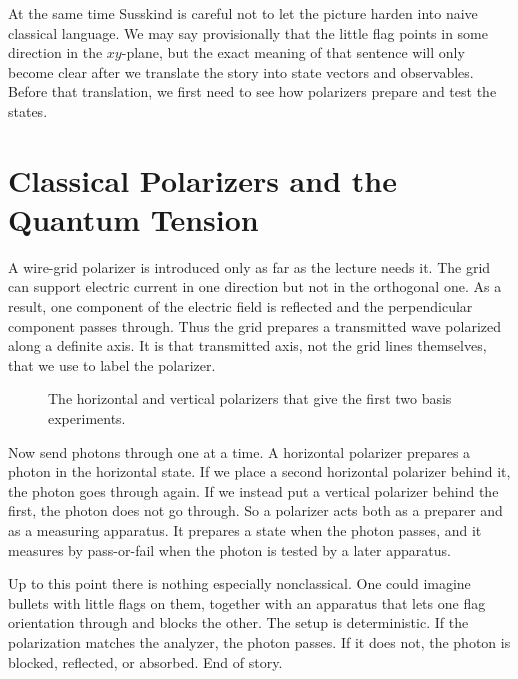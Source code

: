 At the same time Susskind is careful not to let the picture harden into naive classical language. We may say provisionally that the little flag points in some direction in the \(xy\)-plane, but the exact meaning of that sentence will only become clear after we translate the story into state vectors and observables. Before that translation, we first need to see how polarizers prepare and test the states.

\section{Classical Polarizers and the Quantum Tension}

A wire-grid polarizer is introduced only as far as the lecture needs it. The grid can support electric current in one direction but not in the orthogonal one. As a result, one component of the electric field is reflected and the perpendicular component passes through. Thus the grid prepares a transmitted wave polarized along a definite axis. It is that transmitted axis, not the grid lines themselves, that we use to label the polarizer.

\begin{figure}
\centering
{}
\caption{The horizontal and vertical polarizers that give the first two basis experiments.}
\end{figure}

Now send photons through one at a time. A horizontal polarizer prepares a photon in the horizontal state. If we place a second horizontal polarizer behind it, the photon goes through again. If we instead put a vertical polarizer behind the first, the photon does not go through. So a polarizer acts both as a preparer and as a measuring apparatus. It prepares a state when the photon passes, and it measures by pass-or-fail when the photon is tested by a later apparatus.

Up to this point there is nothing especially nonclassical. One could imagine bullets with little flags on them, together with an apparatus that lets one flag orientation through and blocks the other. The setup is deterministic. If the polarization matches the analyzer, the photon passes. If it does not, the photon is blocked, reflected, or absorbed. End of story.

